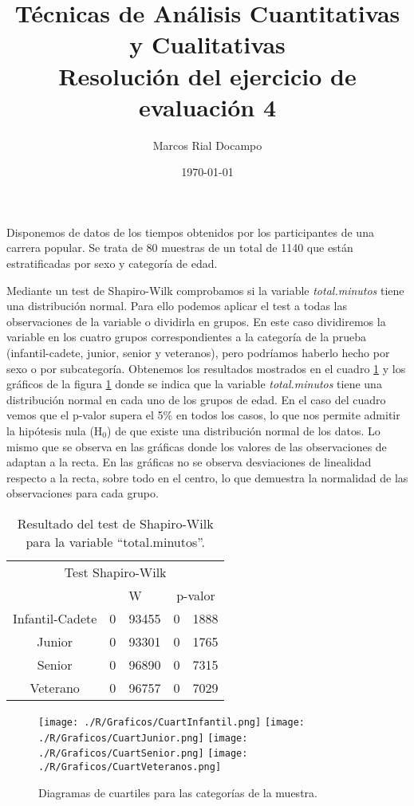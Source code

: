 \documentclass[11pt,a4paper]{article}
\author{Marcos Rial Docampo}
\title{Técnicas de Análisis Cuantitativas y Cualitativas\\Resolución del ejercicio de evaluación 4}
\date{\small{\today}}
\begin{document}
\maketitle

Disponemos de datos de los tiempos obtenidos por los participantes de una carrera popular. Se trata de 80 muestras de un total de 1140 que están estratificadas por sexo y categoría de edad.

Mediante un test de Shapiro-Wilk comprobamos si la variable \textit{total.minutos} tiene una distribución normal. Para ello podemos aplicar el test a todas las observaciones de la variable o dividirla en grupos. En este caso dividiremos la variable en los cuatro grupos correspondientes a la categoría de la prueba (infantil-cadete, junior, senior y veteranos), pero podríamos haberlo hecho por sexo o por subcategoría. Obtenemos los resultados mostrados en el cuadro \ref{tab:Shapiro} y los gráficos de la figura \ref{fig:diagrama} donde se indica que la variable \textit{total.minutos} tiene una distribución normal en cada uno de los grupos de edad. {\color{dkgreen}En el caso del cuadro vemos que el p-valor supera el 5\% en todos los casos, lo que nos permite admitir la hipótesis nula (H$_{0}$) de que existe una distribución normal de los datos. Lo mismo que se observa en las gráficas donde los valores de las observaciones de adaptan a la recta. En las gráficas no se observa desviaciones de linealidad respecto a la recta, sobre todo en el centro, lo que demuestra la normalidad de las observaciones para cada grupo.}

\begin{table}[ht]
\centering
\begin{tabular}{cr@{,}lr@{,}l}
\toprule[0.4mm]
\multicolumn{5}{c}{Test Shapiro-Wilk}\\
 & \multicolumn{2}{c}{W} & \multicolumn{2}{c}{p-valor}\\
\midrule
Infantil-Cadete & 0&93455 & 0&1888\\
Junior & 0&93301 & 0&1765\\
Senior & 0&96890 & 0&7315\\
Veterano & 0&96757 & 0&7029\\
\bottomrule[0.4mm]
\end{tabular}
\caption{Resultado del test de Shapiro-Wilk para la variable ``total.minutos''.}
\label{tab:Shapiro}
\end{table}

\begin{figure}
\centering
\texttt{[image: ./R/Graficos/CuartInfantil.png]}
\texttt{[image: ./R/Graficos/CuartJunior.png]}
\texttt{[image: ./R/Graficos/CuartSenior.png]}
\texttt{[image: ./R/Graficos/CuartVeteranos.png]}
\caption{Diagramas de cuartiles para las categorías de la muestra.}
\label{fig:diagrama}
\end{figure}
\end{document}
